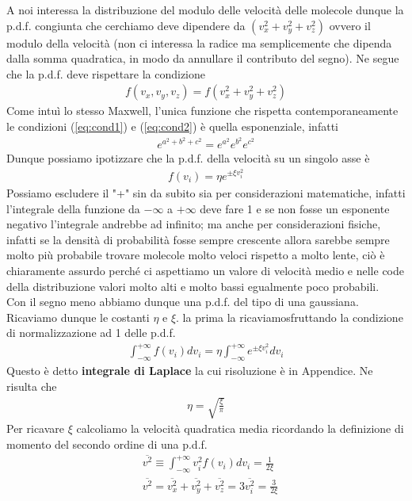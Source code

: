 \documentclass[10pt,a4paper]{article}
\begin{document}
A noi interessa la distribuzione del modulo delle velocità delle molecole dunque la p.d.f. congiunta che cerchiamo deve dipendere da $(v_x^2+v_y^2+v_z^2)$ ovvero il modulo della velocità (non ci interessa la radice ma semplicemente che dipenda dalla somma quadratica, in modo da annullare il contributo del segno). Ne segue che la p.d.f. deve rispettare la condizione
\begin{align}\label{eq:cond2}
	f(v_x,v_y,v_z) = f(v_x^2+v_y^2+v_z^2)
\end{align}
Come intuì lo stesso Maxwell, l'unica funzione che rispetta contemporaneamente le condizioni (\ref{eq:cond1}) e (\ref{eq:cond2}) è quella esponenziale, infatti
\begin{align*}
	e^{a^2+b^2+c^2}=e^{a^2} e^{b^2} e^{c^2}
\end{align*}
Dunque possiamo ipotizzare che la p.d.f. della velocità su un singolo asse è
\begin{align*}
	f(v_i) = \eta e^{\pm \xi v_i^2}
\end{align*}
Possiamo escludere il "+" sin da subito sia per considerazioni matematiche, infatti l'integrale della funzione da $- \infty$ a $+ \infty$ deve fare 1 e se non fosse un esponente negativo l'integrale andrebbe ad infinito; ma anche per considerazioni fisiche, infatti se la densità di probabilità fosse sempre crescente allora sarebbe sempre molto più probabile trovare molecole molto veloci rispetto a molto lente, ciò è chiaramente assurdo perché ci aspettiamo un valore di velocità medio e nelle code della distribuzione valori molto alti e molto bassi egualmente poco probabili.\\
Con il segno meno abbiamo dunque una p.d.f. del tipo di una gaussiana. Ricaviamo dunque le costanti $\eta$ e $\xi$. la prima la ricaviamosfruttando la condizione di normalizzazione ad 1 delle p.d.f.
\begin{align*}
	\int_{-\infty}^{+\infty} f(v_i)dv_i = \eta \int_{-\infty}^{+\infty} e^{\pm \xi v_i^2} dv_i
\end{align*}
Questo è detto \textbf{integrale di Laplace} la cui risoluzione è in Appendice. Ne risulta che
\begin{align*}
	\eta = \sqrt{\frac{\xi}{\pi}}
\end{align*}
Per ricavare $\xi$ calcoliamo la velocità quadratica media ricordando la definizione di momento del secondo ordine di una p.d.f.
\begin{align*}
	&\overline{v^2} \equiv \int_{-\infty}^{+\infty} v_i^2 f(v_i)dv_i = \frac{1}{2\xi}\\
	&\overline{v^2} = \overline{v_x^2}+\overline{v_y^2}+\overline{v_z^2} = 3\overline{ v_i^2} = \frac{3}{2\xi}
\end{align*}
\end{document}
